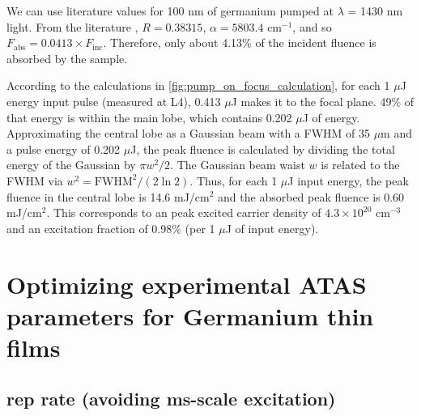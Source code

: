 We can use literature values for 100 nm of germanium pumped at $\lambda$ = 1430 nm light. From the literature \cite{nunleyOpticalConstantsGermanium2016}, $R = 0.38315$, $\alpha = 5803.4 \text{ cm}^{-1}$, and so $F_{\text{abs}} = 0.0413 \times F_{\text{inc}}$. Therefore, only about 4.13\% of the incident fluence is absorbed by the sample.

According to the calculations in \cref{fig:pump_on_focus_calculation}, for each 1 $\mu$J energy input pulse (measured at L4), 0.413 $\mu$J makes it to the focal plane. 49\% of that energy is within the main lobe, which contains 0.202 $\mu$J of energy. Approximating the central lobe as a Gaussian beam with a FWHM of 35 $\mu$m and a pulse energy of 0.202 $\mu$J, the peak fluence is calculated by dividing the total energy of the Gaussian by $\pi w^2/2$. The Gaussian beam waist $w$ is related to the FWHM via $w^2 = \text{FWHM}^2 / (2 \ln 2)$. Thus, for each 1 $\mu$J input energy, the peak fluence in the central lobe is 14.6 mJ/cm$^2$ and the absorbed peak fluence is 0.60 mJ/cm$^2$. This corresponds to an peak excited carrier density of $4.3 \times 10^{20} \text{ cm}^{-3}$ and an excitation fraction of 0.98\% (per 1 $\mu$J of input energy).


\section{Optimizing experimental ATAS parameters for Germanium thin films}

\subsection{rep rate (avoiding ms-scale excitation)}

